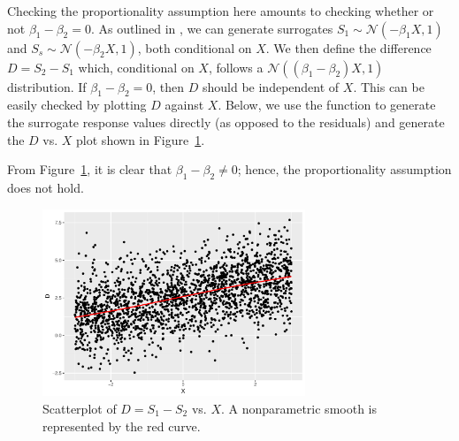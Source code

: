 Checking the proportionality assumption here amounts to checking whether or not $\beta_1 - \beta_2 = 0$. As outlined in \citet{residuals-liu-2017}, we can generate surrogates $S_1 \sim \mathcal{N}\left(-\beta_1 X, 1\right)$ and $S_s \sim \mathcal{N}\left(-\beta_2 X, 1\right)$, both conditional on $X$. We then define the difference $D = S_2 - S_1$ which, conditional on $X$, follows a $\mathcal{N}\left(\left(\beta_1 - \beta_2\right) X, 1\right)$ distribution. If $\beta_1 - \beta_2 = 0$, then $D$ should be independent of $X$. This can be easily checked by plotting $D$ against $X$. Below, we use the  function to generate the surrogate response values directly (as opposed to the residuals) and generate the $D$ vs. $X$ plot shown in Figure~\ref{fig:proportionality}.
From Figure~\ref{fig:proportionality}, it is clear that $\beta_1 - \beta_2 $; hence, the proportionality assumption does not hold.

\begin{figure}[!htbp]
  \centering
  \includegraphics[width=0.7\textwidth]{proportionality}
  \caption{Scatterplot of $D = S_1 - S_2$ vs. $X$. A nonparametric smooth is represented by the red curve.}
  \label{fig:proportionality}
\end{figure}


